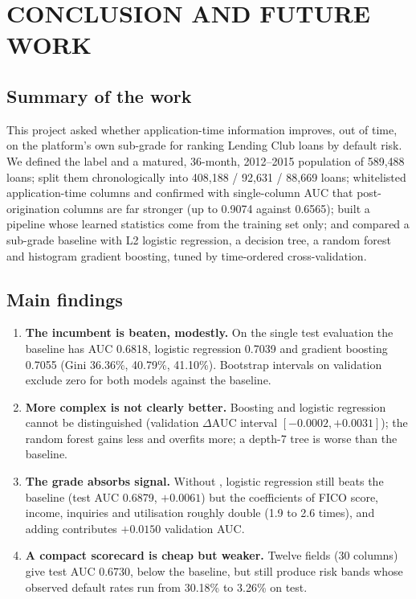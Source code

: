 \section*{CONCLUSION AND FUTURE WORK}

\subsection*{Summary of the work}

This project asked whether application-time information improves, out of time, on the platform's own sub-grade for ranking Lending Club loans by default risk. We defined the label and a matured, 36-month, 2012--2015 population of 589,488 loans; split them chronologically into 408,188 / 92,631 / 88,669 loans; whitelisted application-time columns and confirmed with single-column AUC that post-origination columns are far stronger (up to 0.9074 against 0.6565); built a pipeline whose learned statistics come from the training set only; and compared a sub-grade baseline with L2 logistic regression, a decision tree, a random forest and histogram gradient boosting, tuned by time-ordered cross-validation.

\subsection*{Main findings}

\begin{enumerate}
    \item \textbf{The incumbent is beaten, modestly.} On the single test evaluation the baseline has AUC 0.6818, logistic regression 0.7039 and gradient boosting 0.7055 (Gini 36.36\%, 40.79\%, 41.10\%). Bootstrap intervals on validation exclude zero for both models against the baseline.
    \item \textbf{More complex is not clearly better.} Boosting and logistic regression cannot be distinguished (validation $\Delta$AUC interval $[-0.0002,+0.0031]$); the random forest gains less and overfits more; a depth-7 tree is worse than the baseline.
    \item \textbf{The grade absorbs signal.} Without , logistic regression still beats the baseline (test AUC 0.6879, $+0.0061$) but the coefficients of FICO score, income, inquiries and utilisation roughly double (1.9 to 2.6 times), and adding  contributes $+0.0150$ validation AUC.
    \item \textbf{A compact scorecard is cheap but weaker.} Twelve fields (30 columns) give test AUC 0.6730, below the baseline, but still produce risk bands whose observed default rates run from 30.18\% to 3.26\% on test.
\end{enumerate}

